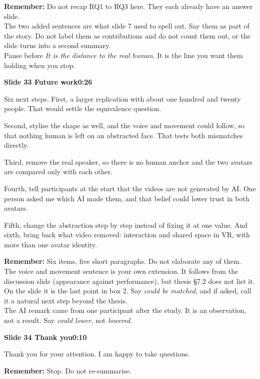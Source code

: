 \documentclass[11pt,a4paper]{article}
\newcommand{\slidehead}[3]{%
  \needspace{5\baselineskip}
  \vspace{0.9em}
  \noindent\colorbox{knblue}{\parbox{0.978\textwidth}{\vspace{1pt}\color{white}\textbf{Slide #1 \quad #2}\hfill\textbf{#3}\vspace{1pt}}}
  \vspace{0.35em}\par}
\newcommand{\remind}[1]{%
  \vspace{0.15em}
  \noindent\colorbox{knlight}{\parbox{0.972\textwidth}{\small\color{knblue}\textbf{Remember:} #1}}
  \vspace{0.2em}\par}
\begin{document}
\remind{Do not recap RQ1 to RQ3 here. They each already have an answer slide.\\[0.4em] The two added sentences are what slide 7 used to spell out. Say them as part of the story. Do not label them as contributions and do not count them out, or the slide turns into a second summary.\\[0.4em] Pause before \emph{It is the distance to the real human}. It is the line you want them holding when you stop.}

\slidehead{33}{Future work}{0:26}

Six next steps. First, a larger replication with about one hundred and twenty people. That would settle the equivalence question.

Second, stylise the shape as well, and the voice and movement could follow, so that nothing human is left on an abstracted face. That tests both mismatches directly.

Third, remove the real speaker, so there is no human anchor and the two avatars are compared only with each other.

Fourth, tell participants at the start that the videos are not generated by AI. One person asked me which AI made them, and that belief could lower trust in both avatars.

Fifth, change the abstraction step by step instead of fixing it at one value. And sixth, bring back what video removed: interaction and shared space in VR, with more than one avatar identity.

\remind{Six items, five short paragraphs. Do not elaborate any of them.\\[0.4em] The voice and movement sentence is your own extension. It follows from the discussion slide (appearance against performance), but thesis §7.2 does not list it. On the slide it is the last point in box 2. Say \emph{could be matched}, and if asked, call it a natural next step beyond the thesis.\\[0.4em] The AI remark came from one participant after the study. It is an observation, not a result. Say \emph{could lower}, not \emph{lowered}.}

\slidehead{34}{Thank you}{0:10}

Thank you for your attention. I am happy to take questions.

\remind{Stop. Do not re-summarise.}
\end{document}
